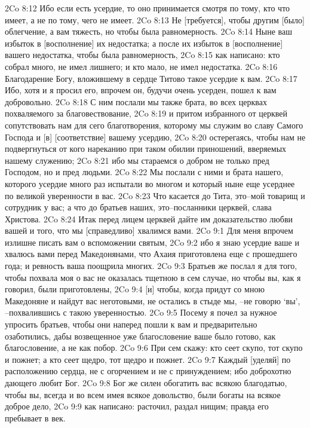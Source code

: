 2Co 8:12  Ибо если есть усердие, то оно принимается смотря по тому, кто что имеет, а не по тому, чего не имеет.
2Co 8:13  Не [требуется], чтобы другим [было] облегчение, а вам тяжесть, но чтобы была равномерность.
2Co 8:14  Ныне ваш избыток в [восполнение] их недостатка; а после их избыток в [восполнение] вашего недостатка, чтобы была равномерность,
2Co 8:15  как написано: кто собрал много, не имел лишнего; и кто мало, не имел недостатка.
2Co 8:16  Благодарение Богу, вложившему в сердце Титово такое усердие к вам.
2Co 8:17  Ибо, хотя и я просил его, впрочем он, будучи очень усерден, пошел к вам добровольно.
2Co 8:18  С ним послали мы также брата, во всех церквах похваляемого за благовествование,
2Co 8:19  и притом избранного от церквей сопутствовать нам для сего благотворения, которому мы служим во славу Самого Господа и [в] [соответствие] вашему усердию,
2Co 8:20  остерегаясь, чтобы нам не подвергнуться от кого нареканию при таком обилии приношений, вверяемых нашему служению;
2Co 8:21  ибо мы стараемся о добром не только пред Господом, но и пред людьми.
2Co 8:22  Мы послали с ними и брата нашего, которого усердие много раз испытали во многом и который ныне еще усерднее по великой уверенности в вас.
2Co 8:23  Что касается до Тита, это--мой товарищ и сотрудник у вас; а что до братьев наших, это--посланники церквей, слава Христова.
2Co 8:24  Итак перед лицем церквей дайте им доказательство любви вашей и того, что мы [справедливо] хвалимся вами.
2Co 9:1  Для меня впрочем излишне писать вам о вспоможении святым,
2Co 9:2  ибо я знаю усердие ваше и хвалюсь вами перед Македонянами, что Ахаия приготовлена еще с прошедшего года; и ревность ваша поощрила многих.
2Co 9:3  Братьев же послал я для того, чтобы похвала моя о вас не оказалась тщетною в сем случае, но чтобы вы, как я говорил, были приготовлены,
2Co 9:4  [и] чтобы, когда придут со мною Македоняне и найдут вас неготовыми, не остались в стыде мы, --не говорю `вы', --похвалившись с такою уверенностью.
2Co 9:5  Посему я почел за нужное упросить братьев, чтобы они наперед пошли к вам и предварительно озаботились, дабы возвещенное уже благословение ваше было готово, как благословение, а не как побор.
2Co 9:6  При сем скажу: кто сеет скупо, тот скупо и пожнет; а кто сеет щедро, тот щедро и пожнет.
2Co 9:7  Каждый [уделяй] по расположению сердца, не с огорчением и не с принуждением; ибо доброхотно дающего любит Бог.
2Co 9:8  Бог же силен обогатить вас всякою благодатью, чтобы вы, всегда и во всем имея всякое довольство, были богаты на всякое доброе дело,
2Co 9:9  как написано: расточил, раздал нищим; правда его пребывает в век.
